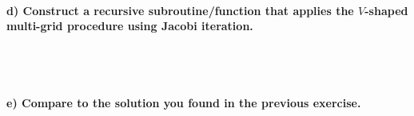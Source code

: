 \paragraph{
    d) Construct a recursive subroutine/function that applies the
    $V$-shaped multi-grid procedure using Jacobi iteration.
} \ \\
    \\

\paragraph{
    e) Compare to the solution you found in the previous exercise.
} \ \\
    \\
